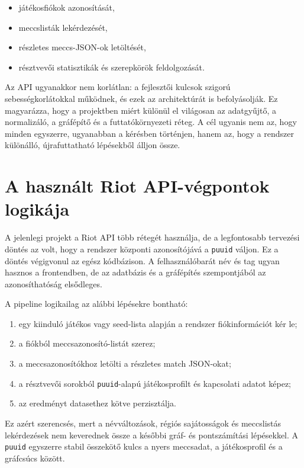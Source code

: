 \documentclass[a4paper,12pt]{report}
\begin{document}
\begin{itemize}
    \item játékosfiókok azonosítását,
    \item meccslisták lekérdezését,
    \item részletes meccs-JSON-ok letöltését,
    \item résztvevői statisztikák és szerepkörök feldolgozását.
\end{itemize}

Az API ugyanakkor nem korlátlan: a fejlesztői kulcsok szigorú sebességkorlátokkal működnek, és ezek az architektúrát is befolyásolják. Ez magyarázza, hogy a projektben miért különül el világosan az adatgyűjtő, a normalizáló, a gráfépítő és a futtatókörnyezeti réteg. A cél ugyanis nem az, hogy minden egyszerre, ugyanabban a kérésben történjen, hanem az, hogy a rendszer különálló, újrafuttatható lépésekből álljon össze.

\section{A használt Riot API-végpontok logikája}

A jelenlegi projekt a Riot API több rétegét használja, de a legfontosabb tervezési döntés az volt, hogy a rendszer központi azonosítójává a \texttt{puuid} váljon. Ez a döntés végigvonul az egész kódbázison. A felhasználóbarát név és tag ugyan hasznos a frontendben, de az adatbázis és a gráfépítés szempontjából az azonosíthatóság elsődleges.

A pipeline logikailag az alábbi lépésekre bontható:

\begin{enumerate}
    \item egy kiinduló játékos vagy seed-lista alapján a rendszer fiókinformációt kér le;
    \item a fiókból meccsazonosító-listát szerez;
    \item a meccsazonosítókhoz letölti a részletes match JSON-okat;
    \item a résztvevői sorokból \texttt{puuid}-alapú játékosprofilt és kapcsolati adatot képez;
    \item az eredményt datasethez kötve perzisztálja.
\end{enumerate}

Ez azért szerencsés, mert a névváltozások, régiós sajátosságok és meccslistás lekérdezések nem keverednek össze a későbbi gráf- és pontszámítási lépésekkel. A \texttt{puuid} egyszerre stabil összekötő kulcs a nyers meccsadat, a játékosprofil és a gráfcsúcs között.
\end{document}
